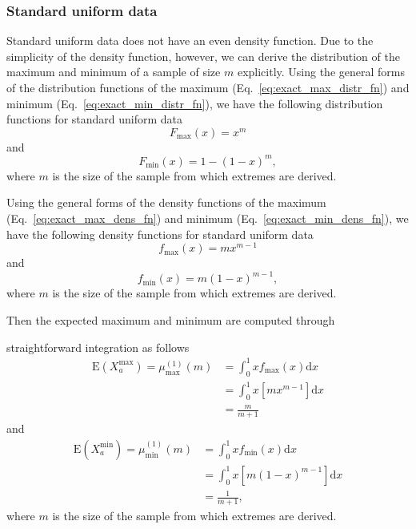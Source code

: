 \documentclass[aos]{imsart}
\begin{document}
\subsubsection{Standard uniform data}

Standard uniform data does not have an even density function. Due to the simplicity of the density function, however, we can derive the distribution of the maximum and minimum of a sample of size $m$ explicitly. Using the general forms of the distribution functions of the maximum (Eq.~\ref{eq:exact_max_distr_fn}) and minimum (Eq.~\ref{eq:exact_min_distr_fn}), we have the following distribution functions for standard uniform data
%
\begin{equation}\label{eq:uniform_max_distr}
F_\text{max}(x) = x^m
\end{equation}
%
and
%
\begin{equation}\label{eq:uniform_min_distr}
F_\text{min}(x) = 1 - (1 - x)^m,
\end{equation}
%
where $m$ is the size of the sample from which extremes are derived.

Using the general forms of the density functions of the maximum (Eq.~\ref{eq:exact_max_dens_fn}) and minimum (Eq.~\ref{eq:exact_min_dens_fn}), we have the following density functions for standard uniform data
%
\begin{equation}\label{eq:uniform_max_dens}
f_\text{max}(x) = m x^{m-1}
\end{equation}
%
and
%
\begin{equation}\label{eq:uniform_min_dens}
f_\text{min}(x) = m(1 - x)^{m-1},
\end{equation}
%
where $m$ is the size of the sample from which extremes are derived.

Then the expected maximum and minimum are computed through 

\noindent straightforward integration as follows
%
\begin{equation}\label{eq:mu_max_uniform}
\begin{aligned}
\text{E}(X^\text{max}_a) = \mu^{(1)}_\text{max}(m) &= \int_{0}^{1} x f_\text{max}(x) \text{d}x \\
&= \int_{0}^{1} x [m x^{m-1}] \text{d}x \\
&= \frac{m}{m+1}
\end{aligned}
\end{equation}
%
and
%
\begin{equation}\label{eq:mu_min_uniform}
\begin{aligned}
\text{E}(X^\text{min}_a) = \mu^{(1)}_\text{min}(m) &= \int_{0}^{1} x f_\text{min}(x) \text{d}x \\
&= \int_{0}^{1} x [m (1 - x)^{m-1}] \text{d}x \\
&= \frac{1}{m+1},
\end{aligned}
\end{equation}
%
where $m$ is the size of the sample from which extremes are derived.
\end{document}
